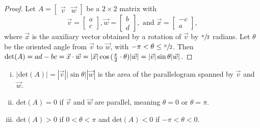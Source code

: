 \documentclass[a4paper,8pt]{article}
\begin{document}
\begin{outline}
    \begin{proof}
      Let \(A = \begin{bmatrix} \vec{v} & \vec{w} \end{bmatrix}\) be a \(2 \times 2\) matrix with
      \[
        \vec{v} = \begin{bmatrix} a \\ c \end{bmatrix},
        \vec{w} = \begin{bmatrix} b \\ d \end{bmatrix}, \text{ and }
        \vec{x} = \begin{bmatrix} -c \\ a \end{bmatrix},
      \]
      where \(\vec{x}\) is the auxiliary vector obtained by a rotation of \(\vec{v}\) by \(\sfrac{\pi}{2}\) radians.
      Let \(\theta\) be the oriented angle from \(\vec{v}\) to \(\vec{w}\), with \(-\pi < \theta \leq \sfrac{\pi}{2}\).
      Then \(\text{det}(A) = ad-bc = \vec{x}\cdot\vec{w} = |\vec{x}|\cos{(\frac{\pi}{2} \cdot \theta)}|\vec{w}|
      = |\vec{v}|\sin{\theta}|\vec{w}|\).
    \end{proof}

    \begin{enumerate}[i.]
      \item
        \(|\text{det}(A)|=|\vec{v}||\sin{\theta}||\vec{w}|\) is the area of the parallelogram spanned by
        \(\vec{v}\) and \(\vec{w}\).
      \item
        \(\text{det}(A) = 0\) if \(\vec{v}\) and \(\vec{w}\) are parallel, meaning \(\theta = 0\) or
        \(\theta = \pi\).
      \item
        \(\text{det}(A) > 0\) if \(0 < \theta < \pi\) and \(\text{det}(A) < 0\) if \(-\pi < \theta < 0\).
    \end{enumerate}

\end{outline}
\end{document}
